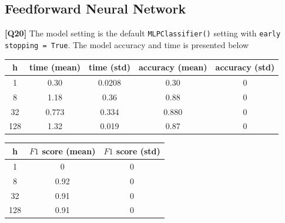 \documentclass{article}
\begin{document}
\begin{description}
		\subsection{Feedforward Neural Network}
	\item \textbf{[Q20]} The model setting is the default \texttt{MLPClassifier()} setting with \texttt{early stopping = True}. The model accuracy and time is presented below
		\begin{center}
			\begin{tabular}{|c|c|c|c|c|}
				\hline
				h & time (mean) & time (std) & accuracy (mean) & accuracy (std) \\
				\hline
				1 & 0.30 & 0.0208 & 0.30 & 0 \\
				8 & 1.18 & 0.36 & 0.88 & 0 \\
				32 & 0.773 & 0.334 & 0.880 & 0 \\
				128 & 1.32 & 0.019 & 0.87 & 0 \\
				\hline
			\end{tabular}
			\vspace{1cm}
			\begin{tabular}{|c|c|c|}
				\hline
				h & $F1$ score (mean) & $F1$ score (std) \\
				\hline
				1 & 0 & 0 \\
				8 & 0.92 & 0 \\
				32 & 0.91 & 0 \\
				128 & 0.91 & 0\\
				\hline
			\end{tabular}
		\end{center}


\end{description}
\end{document}
